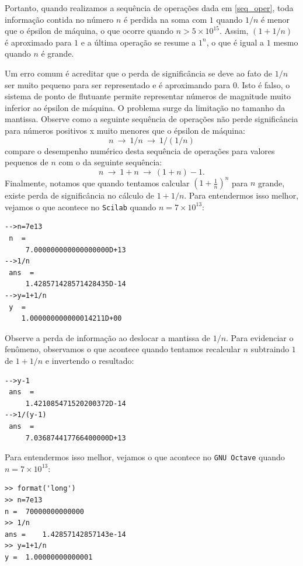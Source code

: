 \begin{ex}
Portanto, quando realizamos a sequência de operações dada em \eqref{seq_oper}, toda informação contida no número $n$ é perdida na soma com $1$ quando $1/n$ é menor que o épsilon de máquina, o que ocorre quando $n>5\times 10^{15}$. Assim, $(1+1/n)$ é aproximado para $1$ e a última operação se resume a $1^n$, o que é igual a $1$ mesmo quando $n$ é grande.

Um erro comum é acreditar que o perda de significância se deve ao fato de $1/n$ ser muito pequeno para ser representado e é aproximando para $0$. Isto é falso, o sistema de ponto de flutuante permite representar números de magnitude muito inferior ao épsilon de máquina. O problema surge da limitação no tamanho da mantissa. Observe como a seguinte sequência de operações não perde significância para números positivos x muito menores que o épsilon de máquina:
\begin{equation}\label{seq_oper2}
n ~\to ~1/n ~\to ~1/(1/n)
\end{equation}
compare o desempenho numérico desta sequência de operações para valores pequenos de $n$ com o da seguinte sequência:
\begin{equation}\label{seq_oper3}
n ~\to ~1+n ~\to ~(1+n)-1.
\end{equation}
Finalmente, notamos que quando tentamos calcular $\left(1+\frac{1}{n}\right)^n$ para $n$ grande, existe perda de significância no cálculo de $1+1/n$.
\ifisscilab
Para entendermos isso melhor, vejamos o que acontece no \verb+Scilab+ quando $n=7\times 10^{13}$:
\begin{verbatim}
-->n=7e13
 n  =
     7.000000000000000000D+13
-->1/n
 ans  =
     1.428571428571428435D-14
-->y=1+1/n
 y  =
    1.000000000000014211D+00
\end{verbatim}
Observe a perda de informação ao deslocar a mantissa de $1/n$. Para evidenciar o fenômeno, observamos o que acontece quando tentamos recalcular $n$ subtraindo $1$ de $1+1/n$ e invertendo o resultado:
\begin{verbatim}
-->y-1
 ans  =
     1.421085471520200372D-14
-->1/(y-1)
 ans  =
     7.036874417766400000D+13
\end{verbatim}
\fi
\ifisoctave
Para entendermos isso melhor, vejamos o que acontece no \verb+GNU Octave+ quando $n=7\times 10^{13}$:
\begin{verbatim}
>> format('long')
>> n=7e13
n =  70000000000000
>> 1/n
ans =    1.42857142857143e-14
>> y=1+1/n
y =  1.00000000000001

\end{verbatim}
\end{ex}
